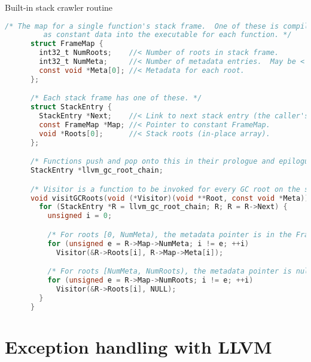 \documentclass[8pt]{beamer}
\begin{document}
\begin{frame}[fragile]{Built-in stack crawler routine}
  \begin{exampleblock}{}
    \begin{lstlisting}[language=C,basicstyle=\tiny\ttfamily]
      /* The map for a single function's stack frame.  One of these is compiled
         as constant data into the executable for each function. */
      struct FrameMap {
        int32_t NumRoots;    //< Number of roots in stack frame.
        int32_t NumMeta;     //< Number of metadata entries.  May be < NumRoots.
        const void *Meta[0]; //< Metadata for each root.
      };

      /* Each stack frame has one of these. */
      struct StackEntry {
        StackEntry *Next;    //< Link to next stack entry (the caller's).
        const FrameMap *Map; //< Pointer to constant FrameMap.
        void *Roots[0];      //< Stack roots (in-place array).
      };

      /* Functions push and pop onto this in their prologue and epilogue. */
      StackEntry *llvm_gc_root_chain;

      /* Visitor is a function to be invoked for every GC root on the stack. */
      void visitGCRoots(void (*Visitor)(void **Root, const void *Meta)) {
        for (StackEntry *R = llvm_gc_root_chain; R; R = R->Next) {
          unsigned i = 0;

          /* For roots [0, NumMeta), the metadata pointer is in the FrameMap. */
          for (unsigned e = R->Map->NumMeta; i != e; ++i)
            Visitor(&R->Roots[i], R->Map->Meta[i]);

          /* For roots [NumMeta, NumRoots), the metadata pointer is null. */
          for (unsigned e = R->Map->NumRoots; i != e; ++i)
            Visitor(&R->Roots[i], NULL);
        }
      }
    \end{lstlisting}
  \end{exampleblock}
\end{frame}

\section[Exception handling]{Exception handling with LLVM}
\subsection*{}
\end{document}
